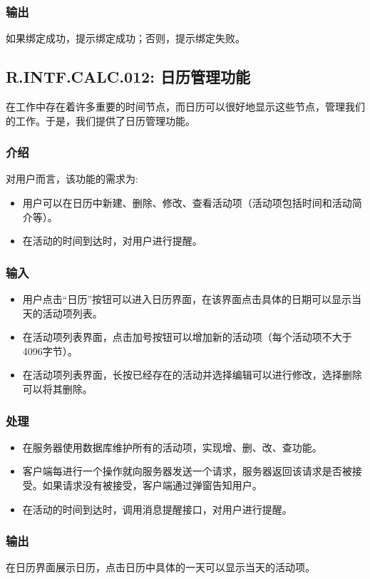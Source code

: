 \subsubsection{输出}
如果绑定成功，提示绑定成功；否则，提示绑定失败。

\subsection{R.INTF.CALC.012: 日历管理功能}
在工作中存在着许多重要的时间节点，而日历可以很好地显示这些节点，管理我们的工作。于是，我们提供了日历管理功能。
\subsubsection{介绍}
对用户而言，该功能的需求为:
\begin{itemize}
  \item 用户可以在日历中新建、删除、修改、查看活动项（活动项包括时间和活动简介等）。
  \item 在活动的时间到达时，对用户进行提醒。
\end{itemize}
\subsubsection{输入}
\begin{itemize}
  \item 用户点击“日历”按钮可以进入日历界面，在该界面点击具体的日期可以显示当天的活动项列表。
  \item 在活动项列表界面，点击加号按钮可以增加新的活动项（每个活动项不大于4096字节）。
  \item 在活动项列表界面，长按已经存在的活动并选择编辑可以进行修改，选择删除可以将其删除。
\end{itemize}
\subsubsection{处理}
\begin{itemize}
  \item 在服务器使用数据库维护所有的活动项，实现增、删、改、查功能。
  \item 客户端每进行一个操作就向服务器发送一个请求，服务器返回该请求是否被接受。如果请求没有被接受，客户端通过弹窗告知用户。
  \item 在活动的时间到达时，调用消息提醒接口，对用户进行提醒。
\end{itemize}
\subsubsection{输出}
在日历界面展示日历，点击日历中具体的一天可以显示当天的活动项。

